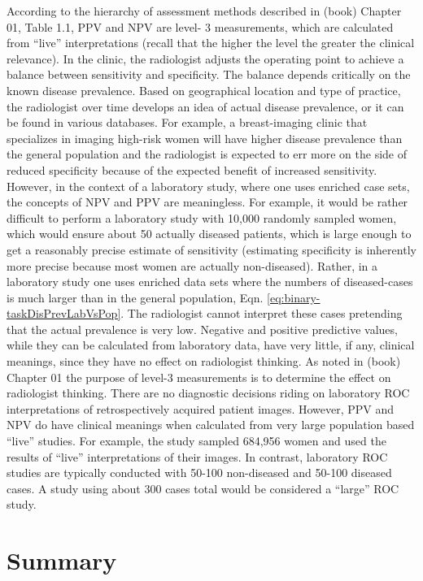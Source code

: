 \documentclass[
]{book}
\begin{document}
According to the hierarchy of assessment methods described in (book) Chapter 01, Table 1.1, PPV and NPV are level- 3 measurements, which are calculated from ``live'' interpretations (recall that the higher the level the greater the clinical relevance). In the clinic, the radiologist adjusts the operating point to achieve a balance between sensitivity and specificity. The balance depends critically on the known disease prevalence. Based on geographical location and type of practice, the radiologist over time develops an idea of actual disease prevalence, or it can be found in various databases. For example, a breast-imaging clinic that specializes in imaging high-risk women will have higher disease prevalence than the general population and the radiologist is expected to err more on the side of reduced specificity because of the expected benefit of increased sensitivity. However, in the context of a laboratory study, where one uses enriched case sets, the concepts of NPV and PPV are meaningless. For example, it would be rather difficult to perform a laboratory study with 10,000 randomly sampled women, which would ensure about 50 actually diseased patients, which is large enough to get a reasonably precise estimate of sensitivity (estimating specificity is inherently more precise because most women are actually non-diseased). Rather, in a laboratory study one uses enriched data sets where the numbers of diseased-cases is much larger than in the general population, Eqn. \eqref{eq:binary-taskDisPrevLabVsPop}. The radiologist cannot interpret these cases pretending that the actual prevalence is very low. Negative and positive predictive values, while they can be calculated from laboratory data, have very little, if any, clinical meanings, since they have no effect on radiologist thinking. As noted in (book) Chapter 01 the purpose of level-3 measurements is to determine the effect on radiologist thinking. There are no diagnostic decisions riding on laboratory ROC interpretations of retrospectively acquired patient images. However, PPV and NPV do have clinical meanings when calculated from very large population based ``live'' studies. For example, the \citep{fenton2007influence} study sampled 684,956 women and used the results of ``live'' interpretations of their images. In contrast, laboratory ROC studies are typically conducted with 50-100 non-diseased and 50-100 diseased cases. A study using about 300 cases total would be considered a ``large'' ROC study.

\hypertarget{binary-task-Summary}{%
\section{Summary}\label{binary-task-Summary}}
\end{document}
